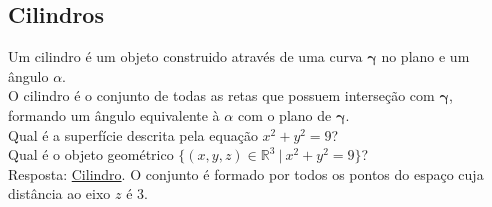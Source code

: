 \documentclass{article}
\begin{document}
\pagebreak

\subsection{Cilindros}
Um cilindro é um objeto construido através de uma curva $\boldsymbol{\gamma}$ no plano e um ângulo $\alpha$. \\[5pt]
O cilindro é o conjunto de todas as retas que possuem interseção com $\boldsymbol{\gamma}$, formando um ângulo equivalente \`a $\alpha$ com o plano de $\boldsymbol{\gamma}$. \\[10pt]
Qual é a superfície descrita pela equação $x^2 + y^2 = 9$? \\[5pt]
Qual é o objeto geométrico $\{ (x, y, z) \in \mathbb{R}^3 \> | \> x^2 + y^2 = 9 \}$? \\[5pt]
Resposta: \uline{Cilindro}. O conjunto é formado por todos os pontos do espaço cuja distância ao eixo $z$ é $3$. \\[-5pt]
\end{document}

